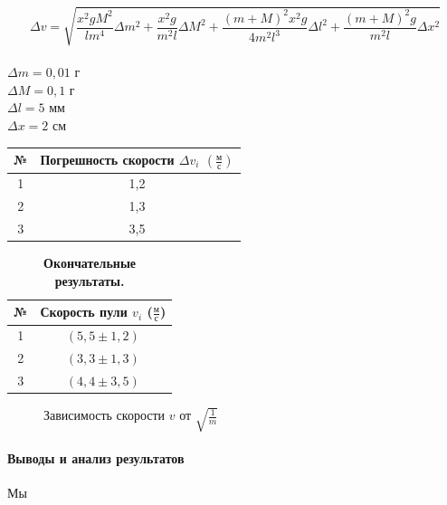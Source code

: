 \documentclass{article}
\begin{document}
$$ \Delta v = \sqrt{\frac{x^2 g M^2}{l m^4}\Delta m^2 +  \frac{x^2 g}{m^2 l}\Delta M^2 + \frac{(m+M)^2 x^2 g}{4m^2 l^3}\Delta l^2 + \frac{(m+M)^2 g}{m^2 l}\Delta x^2}$$\\
$\Delta m = 0,01$ г\\
$ \Delta M = 0,1$ г\\
$ \Delta l =  5$ мм\\
$ \Delta x = 2 $ см
\begin{table}[htb]
	\centering
	\begin{tabular}{|c|c|}
		\hline
		№ & Погрешность скорости $\Delta v_i$ $\left( \frac{\mbox{м}}{\mbox{с}}\right) $\\
		\hline
		1 & 1,2 \\
		\hline
		2 & 1,3\\
		\hline
		3 &  3,5\\
		\hline
	\end{tabular}
\end{table}


\begin{table}[htb]
	\caption{\bf Окончательные результаты.}
	\centering
	\begin{tabular}{|c|c|}
		\hline
		№ & Скорость пули $v_i$ ($\frac{\mbox{м}}{\mbox{с}}$) \\
		\hline
		1 &  $\left( 5,5\pm1,2\right) $ \\
		\hline
		2 &  $\left( 3,3\pm1,3\right) $ \\
		\hline
		3 & $\left( 4,4\pm3,5\right) $ \\
		\hline
	\end{tabular}
\end{table}

\begin{figure}[!htb]
	\centering
	\caption{Зависимость скорости $v$ от $\sqrt{\frac{1}{m}}$}
\end{figure}

\paragraph{Выводы и анализ результатов}
Мы 
\end{document}

